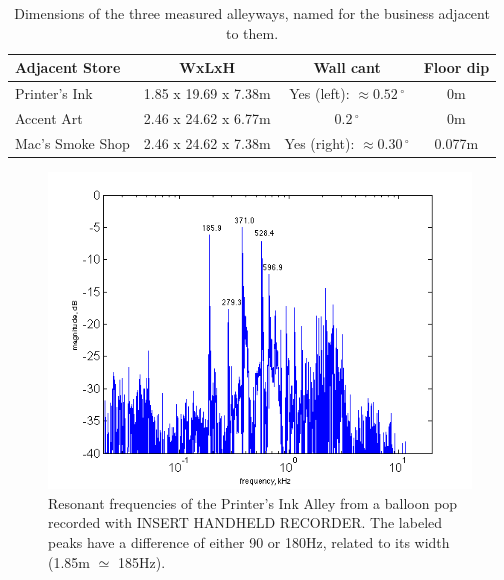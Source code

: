 \documentclass{aes137}
\renewcommand{\deg}{\,^{\circ}}
\begin{document}
\begin{center} \begin{table}[h!]
\footnotesize
\begin{tabular}{|l|c|c|c|}
\hline
\textbf{Adjacent Store} & \textbf{WxLxH} & \textbf{Wall cant} & \textbf{Floor dip} \\
\hline
Printer's Ink & 1.85 x 19.69 x 7.38m & Yes (left): $\approx0.52\deg$ & 0m \\
\hline
Accent Art & 2.46 x 24.62 x 6.77m & $0.2\deg$ & 0m \\
\hline
Mac's Smoke Shop & 2.46 x 24.62 x 7.38m & Yes (right): $\approx0.30\deg$ & 0.077m \\
\hline
\end{tabular} \caption{Dimensions of the three measured alleyways, named for the business adjacent to them.} \end{table}
\normalsize
\end{center}


\begin{figure}[h!] \centering \includegraphics[width=\linewidth]{images/printers_labeled_IR.png} \caption{Resonant frequencies of the Printer's Ink Alley from a balloon pop recorded with INSERT HANDHELD RECORDER. The labeled peaks have a difference of either 90 or 180Hz, related to its width (1.85m $\simeq$ 185Hz).} \end{figure}
\end{document}
